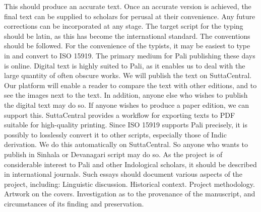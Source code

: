 \markdownRendererOlEnd \markdownRendererInterblockSeparator
{}This should produce an accurate text. Once an accurate version is achieved, the final text can be supplied to scholars for perusal at their convenience. Any future corrections can be incorporated at any stage.\markdownRendererInterblockSeparator
{}The target script for the typing should be latin, as this has become the international standard. The  conventions should be followed. For the convenience of the typists, it may be easiest to type in  and convert to ISO 15919.\markdownRendererInterblockSeparator
{}\markdownRendererInterblockSeparator
{}The primary medium for Pali publishing these days is online. Digital text is highly suited to Pali, as it enables us to deal with the large quantity of often obscure works. We will publish the text on SuttaCentral. Our platform will enable a reader to compare the text with other editions, and to see the images next to the text.\markdownRendererInterblockSeparator
{}In addition, anyone else who wishes to publish the digital text may do so.\markdownRendererInterblockSeparator
{}If anyone wishes to produce a paper edition, we can support this. SuttaCentral provides a workflow for exporting texts to PDF suitable for high-quality printing.\markdownRendererInterblockSeparator
{}Since ISO 15919 supports Pali precisely, it is possibly to losslessly convert it to other scripts, especially those of Indic derivation. We do this automatically on SuttaCentral. So anyone who wants to publish in Sinhala or Devanagari script may do so.\markdownRendererInterblockSeparator
{}\markdownRendererInterblockSeparator
{}As the project is of considerable interest to Pali and other Indological scholars, it should be described in international journals. Such essays should document various aspects of the project, including:\markdownRendererInterblockSeparator
{}\markdownRendererOlBegin
{}Linguistic discussion.\markdownRendererOlItemEnd 
{}Historical context.\markdownRendererOlItemEnd 
{}Project methodology.\markdownRendererOlItemEnd 
{}Artwork on the covers.\markdownRendererOlItemEnd 
{}Investigation as to the provenance of the manuscript, and circumstances of its finding and preservation.\markdownRendererOlItemEnd 

